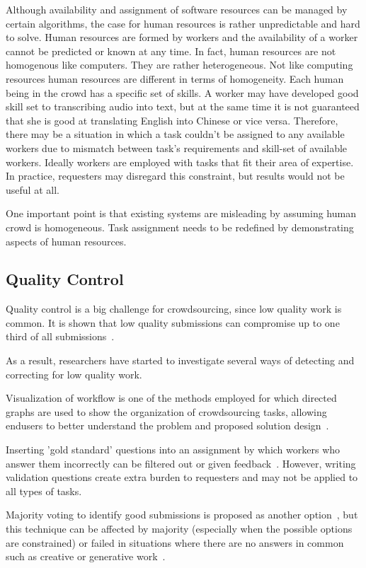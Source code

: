 Although availability and assignment of software resources can be managed 
by certain algorithms, the case for human resources is rather unpredictable and 
hard to solve. Human resources are formed by workers and the availability of a 
worker cannot be predicted or known at any time. In fact, human resources 
are not homogenous like computers. They are rather heterogeneous. Not like 
computing resources human resources are different in terms of homogeneity. 
Each human being in the crowd has a specific set of skills. A worker may have 
developed good skill set to transcribing audio into text, but at the same time it 
is not guaranteed that she is good at translating English into Chinese or vice versa. 
Therefore, there may be a situation 
in which a task couldn't be assigned to any available workers due to mismatch 
between task's requirements and skill-set of available workers. Ideally workers 
are employed with tasks that fit their area of expertise. In practice, requesters 
may disregard this constraint, but results would not be useful at all.

One important point is that existing systems are misleading by assuming 
human crowd is homogeneous. Task assignment needs to be redefined 
by demonstrating aspects of human resources.

\subsection{Quality Control}
Quality control is a big challenge for crowdsourcing, since low quality work 
is common. It is shown that low quality submissions can compromise up to one third 
of all submissions~\cite{Bernstein2010}.


As a result, researchers have started to 
investigate several ways of detecting and correcting for low quality work.

Visualization of workflow is one of the methods employed for which directed graphs 
are used to show the organization of crowdsourcing tasks, allowing endusers 
to better understand the problem and proposed solution design~\cite{Kulkarni2012, Kittur2012}.

Inserting 'gold standard' questions into an assignment by which workers 
who answer them incorrectly can be filtered out or given feedback~\cite{Burch2009}. 
However, writing validation questions create extra burden to requesters and 
may not be applied to all types of tasks.

Majority voting to identify good submissions is proposed as another 
option~\cite{Burch2009, Bernstein2010}, but this technique can be affected 
by majority (especially when the possible options are constrained) or failed in 
situations where there are no answers in common such as creative or generative 
work~\cite{Rzeszotarski2012}.

